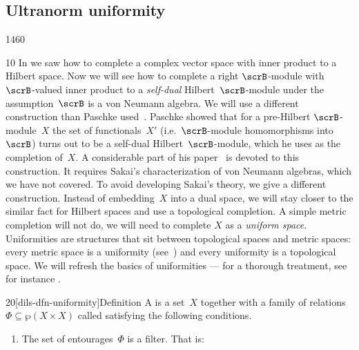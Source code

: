 \subsection{Ultranorm uniformity}
\begin{parsec}{1460}%
\begin{point}{10}%
In 
    we saw how to complete a complex vector space with inner product
    to a Hilbert space.
Now we will see how to complete a right $\scrB$-module
    with $\scrB$-valued inner product
    to a \emph{self-dual} Hilbert~$\scrB$-module
    under the assumption~$\scrB$ is a von Neumann algebra.
    We will use a different construction than Paschke used~\cite{paschke}.
Paschke showed that for a pre-Hilbert $\scrB$-module~$X$
    the set of functionals~$X'$
        (i.e.~$\scrB$-module homomorphisms into~$\scrB$)
    turns out to  be a self-dual Hilbert~$\scrB$-module,
    which he uses as the completion of~$X$.
A considerable part of his paper~\cite{paschke}
    is devoted to this construction.
It requires Sakai's characterization of von Neumann algebras,
    which we have not covered.
To avoid developing Sakai's theory,
    we give a different construction.
Instead of embedding~$X$ into a dual space,
    we will stay closer to the similar fact for Hilbert spaces
    and use a topological completion.
A simple metric completion will not do,
    we will need to complete $X$ as a \emph{uniform space}.
Uniformities are structures that sit between topological spaces
    and metric spaces: every metric space is a uniformity
        (see~)
        and every uniformity is a topological space.
We will refresh the basics of uniformities ---
for a thorough treatment, see for instance \cite[ch.~9]{willard}.
\end{point}
\begin{point}{20}[dils-dfn-uniformity]{Definition}%
    A  is a set~$X$
    together with a family of relations
    $\Phi \subseteq \wp (X\times X)$ called 
        satisfying the following conditions.
    \begin{enumerate}
    \item
        The set of entourages~$\Phi$ is a filter.
        That is:
\end{enumerate}
\end{point}
\end{parsec}
